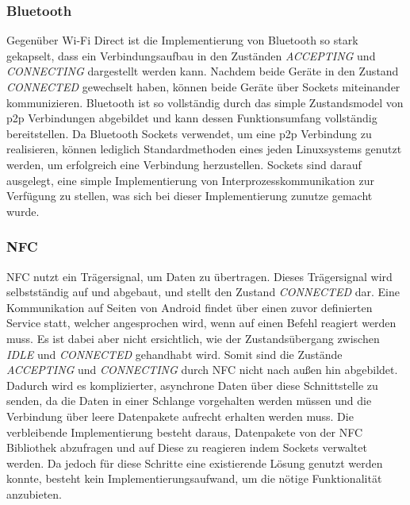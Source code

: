 		\subsubsection{Bluetooth} Gegenüber Wi-Fi Direct ist die Implementierung von Bluetooth so stark gekapselt, dass ein Verbindungsaufbau in den Zuständen {\it ACCEPTING} und {\it CONNECTING} dargestellt werden kann. Nachdem beide Geräte in den Zustand {\it CONNECTED} gewechselt haben, können beide Geräte über Sockets miteinander kommunizieren. Bluetooth ist so vollständig durch das simple Zustandsmodel von p2p Verbindungen abgebildet und kann dessen Funktionsumfang vollständig bereitstellen. Da Bluetooth Sockets verwendet, um eine p2p Verbindung zu realisieren, können lediglich Standardmethoden eines jeden Linuxsystems genutzt werden, um erfolgreich eine Verbindung herzustellen. Sockets sind darauf ausgelegt, eine simple Implementierung von Interprozesskommunikation zur Verfügung zu stellen, was sich bei dieser Implementierung zunutze gemacht wurde.
		
	  \subsubsection{NFC} NFC nutzt ein Trägersignal, um Daten zu übertragen. Dieses Trägersignal wird selbstständig auf und abgebaut, und stellt den Zustand {\it CONNECTED} dar. Eine Kommunikation auf Seiten von Android findet über einen zuvor definierten Service statt, welcher angesprochen wird, wenn auf einen Befehl reagiert werden muss. Es ist dabei aber nicht ersichtlich, wie der Zustandsübergang zwischen {\it IDLE} und {\it CONNECTED} gehandhabt wird. Somit sind die Zustände {\it ACCEPTING} und {\it CONNECTING} durch NFC nicht nach außen hin abgebildet. Dadurch wird es komplizierter, asynchrone Daten über diese Schnittstelle zu senden, da die Daten in einer Schlange vorgehalten werden müssen und die Verbindung über leere Datenpakete aufrecht erhalten werden muss. Die verbleibende Implementierung besteht daraus, Datenpakete von der NFC Bibliothek abzufragen und auf Diese zu reagieren indem Sockets verwaltet werden. Da jedoch für diese Schritte eine existierende Lösung genutzt werden konnte, besteht kein Implementierungsaufwand, um die nötige Funktionalität anzubieten.
	  
